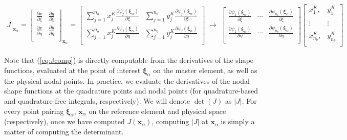 \documentclass[10pt]{article}
\begin{document}
\begin{align}
  J\big|_{\bm{x}_\alpha}
  =
  \begin{bmatrix}
    \frac{\partial x}{\partial \xi} & \frac{\partial y}{\partial \xi} \\
    \frac{\partial x}{\partial \eta} & \frac{\partial y}{\partial \eta} \\
  \end{bmatrix}_{\bm{x}_\alpha}
  =
  \begin{bmatrix}
    \sum\limits_{j=1}^{n_b} x_j^K \frac{\partial \psi_j(\bm{\xi}_\alpha)}{\partial \xi} &
    \sum\limits_{j=1}^{n_b} y_j^K \frac{\partial \psi_j(\bm{\xi}_\alpha)}{\partial \xi} \\
    \sum\limits_{j=1}^{n_b} x_j^K \frac{\partial \psi_j(\bm{\xi}_\alpha)}{\partial \eta} &
    \sum\limits_{j=1}^{n_b} y_j^K \frac{\partial \psi_j(\bm{\xi}_\alpha)}{\partial \eta} \\
  \end{bmatrix}
  \;\rightarrow\;
  \begin{bmatrix}
    \frac{\partial \psi_1(\bm{\xi}_\alpha)}{\partial \xi}
    & \cdots &
    \frac{\partial \psi_{n_b}(\bm{\xi}_\alpha)}{\partial \xi}\\
    \frac{\partial \psi_1(\bm{\xi}_\alpha)}{\partial \eta}
    & \cdots &
    \frac{\partial \psi_{n_b}(\bm{\xi}_\alpha)}{\partial \eta}\\
  \end{bmatrix}
  \begin{bmatrix}
     x_1^K, & y_1^K\\
     & \\
     \vdots & \vdots  \\
     & \\
     x_{n_b}^K, & y_{n_b}^K\\
   \end{bmatrix}
   \label{eq:Jcomp}
\end{align}

Note that (\ref{eq:Jcomp}) is directly computable from the derivatives of the shape functions,
evaluated at the point of interest $\bm{\xi}_\alpha$ on the master element, as well as the physical
nodal points. In practice, we evaluate the derivatives of the nodal shape functions at the
quadrature points and nodal points (for quadrature-based and quadrature-free integrals,
respectively).  We will denote $\det(J)$ as $|J|$. For every point pairing $\bm{\xi}_\alpha,\,
\bm{x}_\alpha$ on the reference element and physical space (respectively), once we have computed
$J(\bm{x}_\alpha)$, computing $|J|$ at $\bm{x}_\alpha$ is simply a matter of computing the
determinant. \\
\end{document}
